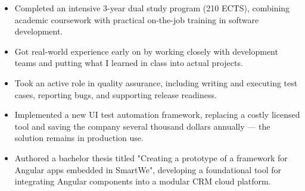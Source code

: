 \documentclass[10pt, a4paper]{cvhari}
\begin{document}
    \vspace{0.2em}
    \begin{itemize}
        \item Completed an intensive 3-year dual study program (210 ECTS), combining academic coursework with practical on-the-job training in software development.

        \item Got real-world experience early on by working closely with development teams and putting what I learned in class into actual projects.

        \item Took an active role in quality assurance, including writing and executing test cases, reporting bugs, and supporting release readiness.

        \item Implemented a new UI test automation framework, replacing a costly licensed tool and saving the company several thousand dollars annually — the solution remains in production use.

        \item Authored a bachelor thesis titled "Creating a prototype of a framework for Angular apps embedded in SmartWe", developing a foundational tool for integrating Angular components into a modular CRM cloud platform.
    \end{itemize}
\medskip
\end{document}
